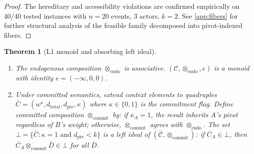 \documentclass[11pt]{article}
\theoremstyle{plain}
\newtheorem{theorem}{Theorem}[section]
\theoremstyle{definition}
\theoremstyle{remark}
\newcommand{\opendo}{\otimes_{\mathrm{endo}}}
\newcommand{\opcommit}{\otimes_{\mathrm{commit}}}
\newcommand{\absorb}{\bot}
\newcommand{\wstar}{{w^{\star}}}
\newcommand{\dtotal}{{d_{\mathrm{total}}}}
\newcommand{\dpre}[1][]{d_{\mathrm{pre}#1}}
\begin{document}
\begin{proof}
The hereditary and accessibility violations are confirmed empirically
on 40/40 tested instances with $n = 20$ events, $3$ actors, $k = 2$.
See \cref{app:fibers} for further structural analysis of the feasible
family decomposed into pivot-indexed fibers.
\end{proof}

\begin{theorem}[L1 monoid and absorbing left ideal]
\label{thm:absorbing-ideal}
\begin{enumerate}[label=(\alph*)]
  \item The endogenous composition $\opendo$ is associative.
    $(\mathcal{C}, \opendo, e)$ is a monoid with identity
    $e = (-\infty, 0, 0)$.
  \item Under committed semantics, extend context elements to
    quadruples $\bar{C} = (\wstar, \dtotal, \dpre, \kappa)$ where
    $\kappa \in \{0,1\}$ is the commitment flag.  Define committed
    composition $\opcommit$ by: if $\kappa_A = 1$, the result inherits
    $A$'s pivot regardless of $B$'s weight; otherwise, $\opcommit$
    agrees with $\opendo$.  The set
    $\absorb = \{\bar{C} : \kappa = 1 \text{ and } \dpre < k\}$ is a
    left ideal of $(\bar{\mathcal{C}}, \opcommit)$:
    if $\bar{C}_A \in \absorb$, then
    $\bar{C}_A \opcommit \bar{D} \in \absorb$ for all $\bar{D}$.
\end{enumerate}
\end{theorem}
\end{document}
